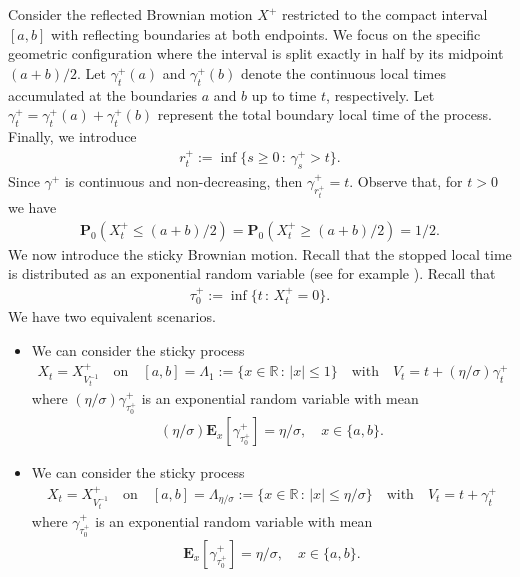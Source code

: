 \documentclass[10pt,a4paper]{article}
\numberwithin{equation}{section}
\theoremstyle{plain}
\theoremstyle{remark}
\begin{document}
Consider the reflected Brownian motion $X^+$ restricted to the compact interval $[a, b]$ with reflecting boundaries at both endpoints. We focus on the specific geometric configuration where the interval is split exactly in half by its midpoint $(a+b)/2$. Let $\gamma^+_t(a)$ and $\gamma^+_t(b)$ denote the continuous local times accumulated at the boundaries $a$ and $b$ up to time $t$, respectively. Let $\gamma^+_t = \gamma^+_t(a) + \gamma^+_t(b)$ represent the total boundary local time of the process. Finally, we introduce
\begin{align*}
r^+_t := \inf\{s \geq 0\,:\, \gamma^+_s > t\}.
\end{align*}
Since $\gamma^+$ is continuous and non-decreasing, then $\gamma^+_{r^+_t}=t$. Observe that, for $t> 0$ we have
\begin{align*}
\mathbf{P}_0(X^+_t \leq (a+b)/2) = \mathbf{P}_0(X^+_t \geq (a+b)/2) = 1/2.
\end{align*}
We now introduce the sticky Brownian motion. Recall that the stopped local time is distributed as an exponential random variable (see for example \cite[Theorem 7.7]{ChugWilliams}). Recall that
\begin{align*}
\tau^+_0 := \inf\{t\,:\, X^+_t =0\}.
\end{align*}
We have two equivalent scenarios.
\begin{itemize}
\item[i)] We can consider the sticky process
\begin{align*}
X_t = X^+_{V^{-1}_t} \quad \textrm{on} \quad [a,b] = \Lambda_{1} := \{x \in \mathbb{R}\,:\, |x| \leq 1 \} \quad \textrm{with} \quad V_t = t + (\eta/\sigma) \gamma^+_t 
\end{align*}
where $(\eta/\sigma) \gamma^+_{\tau^+_0}$ is an exponential random variable with mean 
\begin{align*}
(\eta/\sigma)\mathbf{E}_x[\gamma^+_{\tau^+_0}] = \eta/\sigma, \quad x \in \{a, b\}.
\end{align*}
\item[ii)] We can consider the sticky process
\begin{align*}
X_t = X^+_{V^{-1}_t} \quad \textrm{on} \quad [a,b] = \Lambda_{\eta/\sigma} := \{x \in \mathbb{R}\,:\, |x| \leq \eta/\sigma \} \quad \textrm{with} \quad V_t = t + \gamma^+_t
\end{align*}
where $\gamma^+_{\tau^+_0}$ is an exponential random variable with mean 
\begin{align*}
\mathbf{E}_x[\gamma^+_{\tau^+_0}] = \eta/\sigma, \quad x \in \{a, b\}.
\end{align*}
\end{itemize}
\end{document}
